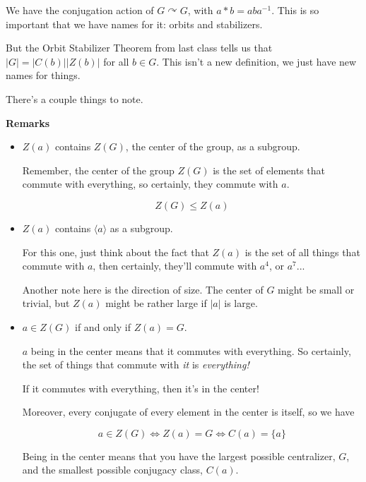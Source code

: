 \documentclass[12pt]{article}
\newcommand{\lr}[1]{\langle #1 \rangle}
\def\acts{\curvearrowright}
\begin{document}
We have the conjugation action of $G \acts G$, with $a * b = a b a^{-1}$. This
is so important that we have names for it: orbits and stabilizers.



But the Orbit Stabilizer Theorem from last class tells us that $|G| =
|C(b)||Z(b)|$ for all $b \in G$. This isn't a new definition, we just have new
names for things.

There's a couple things to note.

{\bf Remarks}

\begin{itemize}
  \item $Z(a)$ contains $Z(G)$, the center of the group, as a subgroup.

    Remember, the center of the group $Z(G)$ is the set of elements that commute
    with everything, so certainly, they commute with $a$.

    \[
      Z(G) \le Z(a)
    \]

  \item $Z(a)$ contains $\lr {a}$ as a subgroup.

    For this one, just think about the fact that $Z(a)$ is the set of all things
    that commute with $a$, then certainly, they'll commute with $a^4$, or
    $a^7$...

    Another note here is the direction of size. The center of $G$ might be small
    or trivial, but $Z(a)$ might be rather large if $|a|$ is large.

  \item $a \in Z(G)$ if and only if $Z(a) = G$.

    $a$ being in the center means that it commutes with everything. So
    certainly, the set of things that commute with {\it it} is {\it everything!}

    If it commutes with everything, then it's in the center!

    Moreover, every conjugate of every element in the center is itself, so we
    have

    \[
      a \in Z(G) \Leftrightarrow Z(a) = G \Leftrightarrow C(a) = \{ a \}
    \]

    Being in the center means that you have the largest possible centralizer,
    $G$, and the smallest possible conjugacy class, $C(a)$.
\end{itemize}
\end{document}
